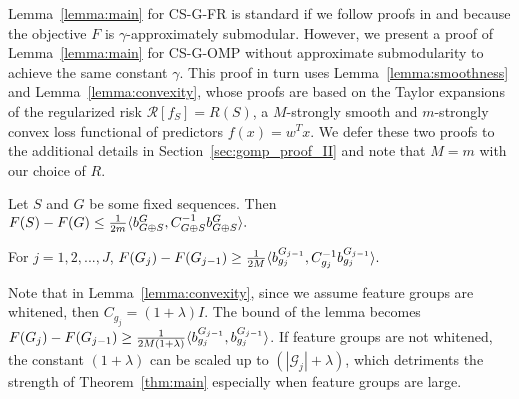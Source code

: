 


Lemma~\ref{lemma:main} for CS-G-FR is standard if we follow proofs in \citep{streeter:08} and \citep{kemp} because the objective $F$ is $\gamma$-approximately submodular. 
However, we present a proof of 
Lemma~\ref{lemma:main} for CS-G-OMP without approximate submodularity to achieve the same constant $\gamma$. 
This proof in turn uses Lemma~\ref{lemma:smoothness} and Lemma~\ref{lemma:convexity}, whose proofs are based on the Taylor expansions of the regularized risk $\mathcal{R}[f_S]=R(S)$, a $M$-strongly smooth and $m$-strongly convex loss functional of predictors $f(x) = w^T x$.
We defer these two proofs to the additional details in Section~\ref{sec:gomp_proof_II} and note that 
$M=m$ with our choice of $R$. 



\begin{lemma}
  Let $S$ and $G$ be some fixed sequences. Then
  \mbox{$
    F(S) - F(G) \leq \frac{1}{2m} \langle b^G_{G \oplus S}, C_{G \oplus S}^{-1} b^G_{G\oplus S} \rangle.
  $}
  \label{lemma:smoothness}
\end{lemma}

\begin{lemma} For $j = 1,2,..., J$, 
    \mbox{$
      F(G_j) - F(G_{j-1}) \geq \frac{1}{2M} \langle  {b^{G_{j-1}}_{g_j}}, C_{g_j}^{-1}b^{G_{j-1}}_{g_j}  \rangle.
    $}
  \label{lemma:convexity}
\end{lemma}
Note that in Lemma~\ref{lemma:convexity}, since we assume feature groups are 
whitened, then $C_{g_j} = (1+\lambda) I$. The bound of the lemma becomes
$F(G_j) - F(G_{j-1}) \geq \frac{1}{2M (1+\lambda)} \langle  {b^{G_{j-1}}_{g_j}}, b^{G_{j-1}}_{g_j}  \rangle$. If feature groups are not whitened, 
the constant $(1+\lambda)$ can be scaled up to $(|\mathcal{G}_j| + \lambda)$, 
which detriments the strength of Theorem~\ref{thm:main} especially when feature 
groups are large. 


